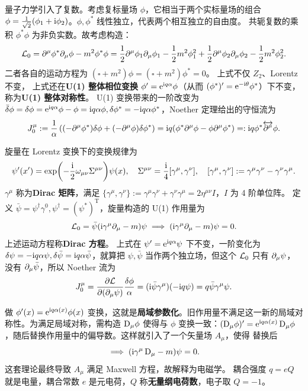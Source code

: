 量子力学引入了复数。考虑复标量场 $\phi$，它相当于两个实标量场的组合 $\phi=\frac{1}{\sqrt{2}}(\phi_1+\mathrm{i} \phi_2)$。$\phi,\phi^*$ 线性独立，代表两个相互独立的自由度。
共轭复数的乘积 $\phi^*\phi$ 为非负实数。故考虑构造：
\[\mathcal{L}_0=\partial^\mu\phi^*\partial_\mu\phi-m^2\phi^*\phi = \frac 12\partial^\mu\phi_1\partial_\mu\phi_1 - \frac 12 m^2\phi_1^2 + \frac 12\partial^\mu\phi_2\partial_\mu\phi_2 - \frac 12 m^2\phi_2^2.\]
二者各自的运动方程为 $(\square+m^2)\phi=(\square+m^2)\phi^*=0$。
上式不仅 $Z_2$、Lorentz 不变，
上式还在\textbf{U(1) 整体相位变换} $\phi'= \mathrm{e}^{\mathrm{i} q \alpha} \phi$（从而 $(\phi^*)' = \mathrm{e}^{-\mathrm{i} \theta}\phi^*$）下不变，称为\textbf{U(1) 整体对称性}。
U(1) 变换带来的一阶改变为 $\bar\var\phi=\var\phi =\mathrm{e}^{\mathrm{i} q\alpha} \phi-\phi=\mathrm{i} q\alpha \phi,\delta \phi^* =-\mathrm{i} q\alpha \phi^*$，Noether 定理给出的守恒流为
\[J^\mu_0 := \frac{1}{\alpha}\left((-\partial^\mu\phi^*)\var\phi + (-\partial^\mu\phi)\var\phi^*\right) = \mathrm{i} q(\phi^* \partial^\mu \phi - \phi\partial^\mu \phi^*) =: \mathrm{i} q \phi^*\overleftrightarrow{\partial^\mu}\phi.\] 




旋量在 Lorentz 变换下的变换规律为
\[\psi'(x') = \exp(-\frac{\mathrm{i}} 2 \omega_{\mu\nu} \Sigma^{\mu\nu}) \psi(x),\quad \Sigma^{\mu\nu} = \frac{\mathrm{i}} 4 [\gamma^\mu,\gamma^\nu], \quad[\gamma^\mu,\gamma^\nu]:=\gamma^\mu\gamma^\nu-\gamma^\nu\gamma^\mu.\]
$\gamma^\mu$ 称为\textbf{Dirac 矩阵}，满足 $\{\gamma^\mu,\gamma^\nu\}:=\gamma^\mu\gamma^\nu+\gamma^\nu\gamma^\mu=2\eta^{\mu\nu}I$，$I$ 为 4 阶单位阵。
定义 $\bar\psi = \psi^\dagger \gamma^0,\psi^\dagger=(\psi^*)^\mathrm{T}$，旋量构造的 U(1) 作用量为
\[\mathcal{L}_0=\bar\psi(\mathrm{i}\gamma^\mu\partial_\mu - m)\psi \implies (\mathrm{i}\gamma^\mu\partial_\mu - m)\psi = 0.\]
上述运动方程称\textbf{Dirac 方程}。
上式在 $\psi'= \mathrm{e}^{\mathrm{i} q \alpha} \psi$ 下不变，一阶变化为 $\delta\psi=-\mathrm{i} q \alpha\psi,\delta\bar\psi=\mathrm{i} q \alpha\bar\psi$，就算把 $\psi,\bar\psi$ 当作两个独立场，但这个 $\mathcal{L}_0$ 只有 $\partial_\mu\psi$，没有 $\partial_\mu\bar\psi$，所以 Noether 流为
\[J^\mu_0 = \pdv{\mathcal{L}}{(\partial_\mu\psi)} \frac{\delta\phi}{\alpha} = (\mathrm{i}\bar\psi\gamma^\mu)(-\mathrm{i} q\psi) = q \bar\psi \gamma^\mu \psi.\]


做 $\phi'(x) = \mathrm{e}^{\mathrm{i} q \alpha(x)} \phi(x)$ 变换，这就是\textbf{局域参数化}。旧作用量不满足这一新的局域对称性。为满足局域对称，需构造 $\D_\mu\phi$ 使得与 $\phi$ 变换一致：$(\D_\mu\phi)' = \e^{\i q\alpha(x)}\D_\mu\phi$，随后替换作用量中的偏导数。这样就引入了一个矢量场 $A_\mu$，使得
替换后
\[\im (\i\gamma^\mu \D_\mu - m)\psi = 0.\]
这套理论最终导致 $A_\mu$ 满足 Maxwell 方程，故解释为电磁学。
耦合强度 $q=eQ$ 就是电量，耦合常数 $e$ 是元电荷，$Q$ 称\textbf{无量纲电荷数}，电子取 $Q=-1$。

